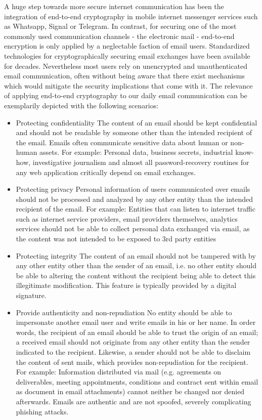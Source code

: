 A huge step towards more secure internet communication has been the integration of end-to-end cryptography in mobile internet messenger services such as Whatsapp, Signal or Telegram. In contrast, for securing one of the most commonly used communication channels - the electronic mail - end-to-end encryption is only applied by a neglectable faction \cite{secureEmail} of email users. Standardized technologies for cryptographically securing email exchanges have been available for decades. Nevertheless most users rely on unencrypted and unauthenticated email communication, often without being aware that there exist mechanisms which would mitigate the security implications that come with it. The relevance of applying end-to-end cryptography to our daily email communication can be exemplarily depicted with the following scenarios:
\begin{itemize}
	\item Protecting confidentiality \newline
	The content of an email should be kept confidential and should not be readable by someone other than the intended recipient of the email. Emails often communicate sensitive data about human or non-human assets.
	For example: Personal data, business secrets, industrial know-how, investigative journalism and almost all password-recovery routines for any web application critically depend on email exchanges.
	\item Protecting privacy \newline
	Personal information of users communicated over emails should not be processed and analyzed by any other entity than the intended recipient of the email.
	For example: Entities that can listen to internet traffic such as internet service providers, email providers themselves, analytics services should not be able to collect personal data exchanged via email, as the content was not intended to be exposed to 3rd party entities
	\item Protecting integrity \newline
	The content of an email should not be tampered with by any other entity other than the sender of an email, i.e. no other entity should be able to altering the content without the recipient being able to detect this illegitimate modification. This feature is typically provided by a digital signature.
	\item Provide authenticity and non-repudiation \newline
	No entity should be able to impersonate another email user and write emails in his or her name. In order words, the recipient of an email should be able to trust the origin of an email; a received email should not originate from any other entity than the sender indicated to the recipient. Likewise, a sender should not be able to disclaim the content of sent mails, which provides non-repudiation for the recipient.
	For example: Information distributed via mail (e.g. agreements on deliverables, meeting appointments, conditions and contract sent within email as document in email attachments) cannot neither be changed nor denied afterwards.
	Emails are authentic and are not spoofed, severely complicating phishing attacks.
\end{itemize}
